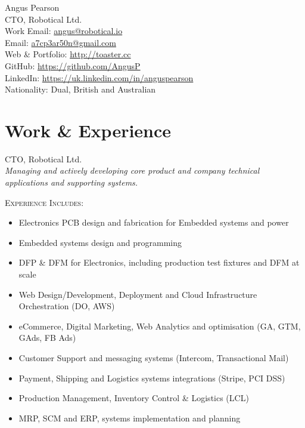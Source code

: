 \documentclass[10pt, a4paper]{article}
\newcommand{\years}[1]{\marginnote{\scriptsize #1}}
\begin{document}
{\huge Angus Pearson}\\[1cm]
CTO, Robotical Ltd.\\

Work Email: \quad\href{mailto:angus@robtical.io}{angus@robotical.io}\\
Email: \quad\href{mailto:a7cp3ar50n@gmail.com}{a7cp3ar50n@gmail.com}\\
Web \& Portfolio: \quad\href{http://toaster.cc}{http://toaster.cc}\\
GitHub:  \quad\href{https://github.com/AngusP}{https://github.com/AngusP} \\
LinkedIn:  \quad\href{https://uk.linkedin.com/in/anguspearson}{https://uk.linkedin.com/in/anguspearson}\\


Nationality: \quad Dual, British and Australian

\section*{Work \& Experience}
\noindent

\years{Jun 2017 -\\ present} CTO, Robotical Ltd.\\
\emph{Managing and actively developing core product and company technical applications and supporting systems.}

\vspace{0.75em}
\textsc{Experience Includes:}
\begin{itemize}
  \itemsep0em
\item Electronics PCB design and fabrication for Embedded systems and power
\item Embedded systems design and programming
\item DFP \& DFM for Electronics, including production test fixtures and DFM at scale
\item Web Design/Development, Deployment and Cloud Infrastructure Orchestration (DO, AWS)
\item eCommerce, Digital Marketing, Web Analytics and optimisation (GA, GTM, GAds, FB Ads)
\item Customer Support and messaging systems (Intercom, Transactional Mail)
\item Payment, Shipping and Logistics systems integrations (Stripe, PCI DSS)
\item Production Management, Inventory Control \& Logistics (LCL) 
\item MRP, SCM and ERP, systems implementation and planning
\end{itemize}
\end{document}
